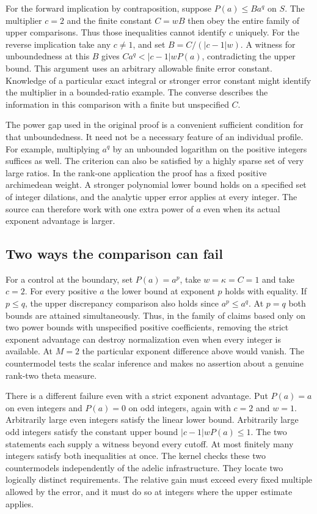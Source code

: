 \documentclass[12pt,letterpaper]{article}
\begin{document}
For the forward implication by contraposition, suppose $P(a)\le B a^q$ on $S$. The multiplier $c=2$ and the finite constant $C=wB$ then obey the entire family of upper comparisons. Thus those inequalities cannot identify $c$ uniquely. For the reverse implication take any $c\ne1$, and set $B=C/(|c-1|w)$. A witness for unboundedness at this $B$ gives $Ca^q<|c-1|wP(a)$, contradicting the upper bound. This argument uses an arbitrary allowable finite error constant. Knowledge of a particular exact integral or stronger error constant might identify the multiplier in a bounded-ratio example. The converse describes the information in this comparison with a finite but unspecified $C$.

The power gap used in the original proof is a convenient sufficient condition for that unboundedness. It need not be a necessary feature of an individual profile. For example, multiplying $a^q$ by an unbounded logarithm on the positive integers suffices as well. The criterion can also be satisfied by a highly sparse set of very large ratios. In the rank-one application the proof has a fixed positive archimedean weight. A stronger polynomial lower bound holds on a specified set of integer dilations, and the analytic upper error applies at every integer. The source can therefore work with one extra power of $a$ even when its actual exponent advantage is larger.

\subsection{Two ways the comparison can fail}

For a control at the boundary, set $P(a)=a^p$, take $w=\kappa=C=1$ and take $c=2$. For every positive $a$ the lower bound at exponent $p$ holds with equality. If $p\le q$, the upper discrepancy comparison also holds since $a^p\le a^q$. At $p=q$ both bounds are attained simultaneously. Thus, in the family of claims based only on two power bounds with unspecified positive coefficients, removing the strict exponent advantage can destroy normalization even when every integer is available. At $M=2$ the particular exponent difference above would vanish. The countermodel tests the scalar inference and makes no assertion about a genuine rank-two theta measure.

There is a different failure even with a strict exponent advantage. Put $P(a)=a$ on even integers and $P(a)=0$ on odd integers, again with $c=2$ and $w=1$. Arbitrarily large even integers satisfy the linear lower bound. Arbitrarily large odd integers satisfy the constant upper bound $|c-1|wP(a)\le1$. The two statements each supply a witness beyond every cutoff. At most finitely many integers satisfy both inequalities at once. The kernel checks these two countermodels independently of the adelic infrastructure. They locate two logically distinct requirements. The relative gain must exceed every fixed multiple allowed by the error, and it must do so at integers where the upper estimate applies.
\end{document}
